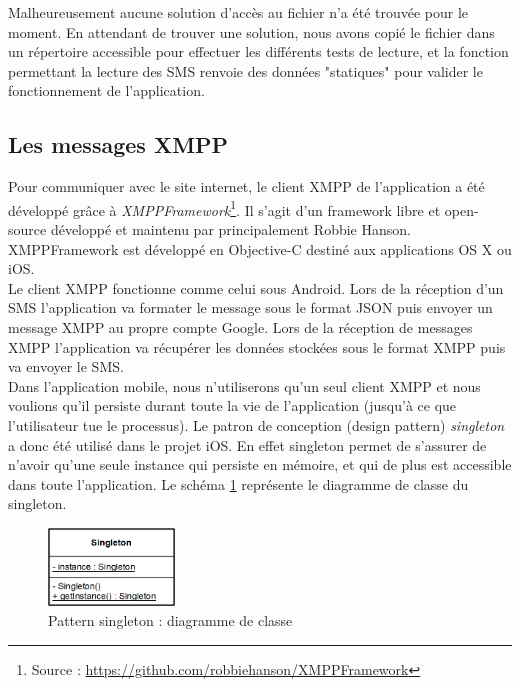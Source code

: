 Malheureusement aucune solution d'accès au fichier n'a été trouvée pour le moment.
En attendant de trouver une solution, nous avons copié le fichier dans un répertoire accessible pour effectuer les différents tests de lecture, et la fonction permettant la lecture des SMS renvoie des données "statiques" pour valider le fonctionnement de l'application.




\subsection{Les messages XMPP}

Pour communiquer avec le site internet, le client XMPP de l'application a été développé grâce à \textit{XMPPFramework}\footnote{Source : \href{https://github.com/robbiehanson/XMPPFramework}{https://github.com/robbiehanson/XMPPFramework}}.
Il s'agit d'un framework libre et open-source développé et maintenu par principalement Robbie Hanson.
XMPPFramework est développé en Objective-C destiné aux applications OS X ou iOS.
\\


Le client XMPP fonctionne comme celui sous Android.
Lors de la réception d'un SMS l'application va formater le message sous le format JSON puis envoyer un message XMPP au propre compte Google.
Lors de la réception de messages XMPP l'application va récupérer les données stockées sous le format XMPP puis va envoyer le SMS.
\\


Dans l'application mobile, nous n'utiliserons qu'un seul client XMPP et nous voulions qu'il persiste durant toute la vie de l'application (jusqu'à ce que l'utilisateur tue le processus).
Le patron de conception (design pattern) \textit{singleton} a donc été utilisé dans le projet iOS.
En effet singleton permet de s'assurer de n'avoir qu'une seule instance qui persiste en mémoire, et qui de plus est accessible dans toute l'application.
Le schéma \ref{pattern_singleton} représente le diagramme de classe du singleton.
\begin{figure}[!h]
	\center
	\includegraphics[width=0.3\textwidth]{img/pattern_singleton.png}
	\caption{Pattern singleton : diagramme de classe}
	\label{pattern_singleton}
\end{figure}
